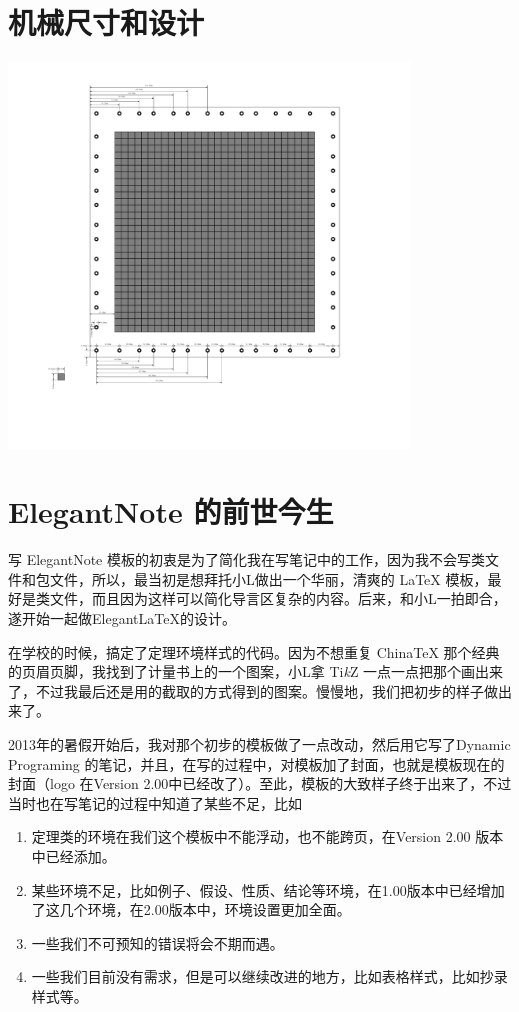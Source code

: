 \documentclass[color=green,mathpazo,titlestyle=hang,11pt]{elegantbook}
\begin{document}
\section{机械尺寸和设计}
\includegraphics[width=0.8\textwidth]{figure/DemensionPadArrayUnit_mm.pdf}
\section{ElegantNote 的前世今生}

写 ElegantNote 模板的初衷是为了简化我在写笔记中的工作，因为我不会写类文件和包文件，所以，最当初是想拜托小L做出一个华丽，清爽的 \LaTeX{} 模板，最好是类文件，而且因为这样可以简化导言区复杂的内容。后来，和小L一拍即合，遂开始一起做Elegant\LaTeX{}的设计。

在学校的时候，搞定了定理环境样式的代码。因为不想重复 China\TeX{} 那个经典的页眉页脚，我找到了计量书上的一个图案，小L拿 Ti\emph{k}Z 一点一点把那个画出来了，不过我最后还是用的截取的方式得到的图案。慢慢地，我们把初步的样子做出来了。

2013年的暑假开始后，我对那个初步的模板做了一点改动，然后用它写了Dynamic Programing 的笔记，并且，在写的过程中，对模板加了封面，也就是模板现在的封面（logo 在Version 2.00中已经改了）。至此，模板的大致样子终于出来了，不过当时也在写笔记的过程中知道了某些不足，比如
\begin{enumerate}
\item 定理类的环境在我们这个模板中不能浮动，也不能跨页，在Version 2.00 版本中已经添加。
\item 某些环境不足，比如例子、假设、性质、结论等环境，在1.00版本中已经增加了这几个环境，在2.00版本中，环境设置更加全面。
\item 一些我们不可预知的错误将会不期而遇。
\item 一些我们目前没有需求，但是可以继续改进的地方，比如表格样式，比如抄录样式等。
\end{enumerate}
\end{document}
